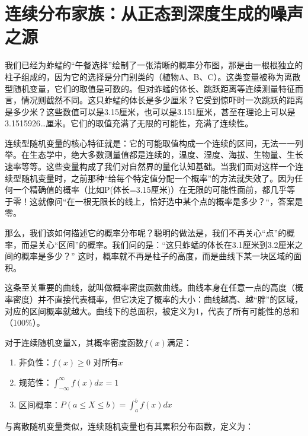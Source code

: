 \documentclass[
  twoside,12pt,fontset=none]{ctexbook}
\providecommand{\tightlist}{%
  \setlength{\itemsep}{0pt}\setlength{\parskip}{0pt}}
\begin{document}
\hypertarget{ux8fdeux7eedux5206ux5e03ux5bb6ux65cfux4eceux6b63ux6001ux5230ux6df1ux5ea6ux751fux6210ux7684ux566aux58f0ux4e4bux6e90}{%
\section{连续分布家族：从正态到深度生成的噪声之源}\label{ux8fdeux7eedux5206ux5e03ux5bb6ux65cfux4eceux6b63ux6001ux5230ux6df1ux5ea6ux751fux6210ux7684ux566aux58f0ux4e4bux6e90}}

我们已经为蚱蜢的``午餐选择''绘制了一张清晰的概率分布图，那是由一根根独立的柱子组成的，因为它的选择是分门别类的（植物A、B、C）。这类变量被称为离散型随机变量，它们的取值是可数的。但对蚱蜢的体长、跳跃距离等连续测量特征而言，情况则截然不同。这只蚱蜢的体长是多少厘米？它受到惊吓时一次跳跃的距离是多少米？这些数值可以是3.15厘米，也可以是3.151厘米，甚至在理论上可以是3.1515926\ldots 厘米。它们的取值充满了无限的可能性，充满了连续性。

连续型随机变量的核心特征就是：它的可能取值构成一个连续的区间，无法一一列举。在生态学中，绝大多数测量值都是连续的，温度、湿度、海拔、生物量、生长速率等等。这些变量构成了我们对自然界的量化认知基础。当我们面对这样一个连续型随机变量时，之前那种``给每个特定值分配一个概率''的方法就失效了。因为任何一个精确值的概率（比如P(体长=3.15厘米)）在无限的可能性面前，都几乎等于零！这就像问``在一根无限长的线上，恰好选中某个点的概率是多少？``，答案是零。

那么，我们该如何描述它的概率分布呢？聪明的做法是，我们不再关心``点''的概率，而是关心``区间''的概率。我们问的是：``这只蚱蜢的体长在3.1厘米到3.2厘米之间的概率是多少？'' 这时，概率就不再是柱子的高度，而是曲线下某一块区域的面积。

这条至关重要的曲线，就叫做概率密度函数曲线。曲线本身在任意一点的高度（概率密度）并不直接代表概率，但它决定了概率的大小：曲线越高、越``胖''的区域，对应的区间概率就越大。曲线下的总面积，被定义为1，代表了所有可能性的总和（100\%）。

对于连续随机变量X，其概率密度函数\(f(x)\)满足：

\begin{enumerate}
\def\labelenumi{\arabic{enumi}.}
\tightlist
\item
  非负性：\(f(x) \geq 0\) 对所有\(x\)
\item
  规范性：\(\int_{-\infty}^{\infty} f(x) dx = 1\)
\item
  区间概率：\(P(a \leq X \leq b) = \int_a^b f(x) dx\)
\end{enumerate}

与离散随机变量类似，连续随机变量也有其累积分布函数，定义为：
\end{document}
